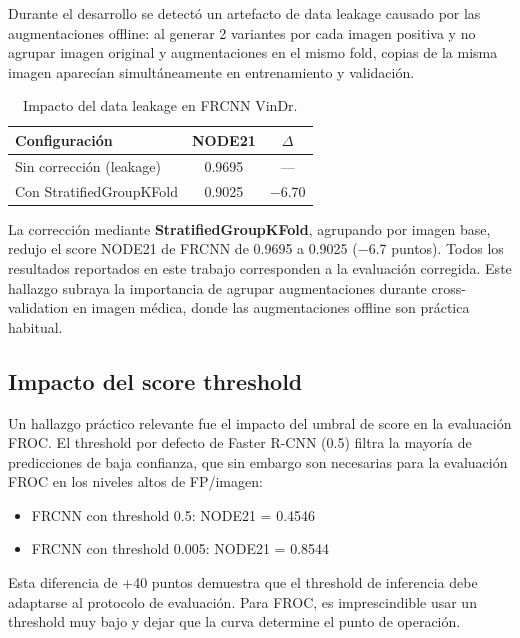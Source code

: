 \documentclass[conference]{IEEEtran}
\begin{document}
Durante el desarrollo se detectó un artefacto de data leakage causado por las augmentaciones offline: al generar 2 variantes por cada imagen positiva y no agrupar imagen original y augmentaciones en el mismo fold, copias de la misma imagen aparecían simultáneamente en entrenamiento y validación.

\begin{table}[!t]
\centering
\caption{Impacto del data leakage en FRCNN VinDr.}
\label{tab:leakage}
\renewcommand{\arraystretch}{1.1}
\begin{tabular}{lcc}
\toprule
\textbf{Configuración} & \textbf{NODE21} & \textbf{$\Delta$} \\
\midrule
Sin corrección (leakage) & 0.9695 & --- \\
Con StratifiedGroupKFold & 0.9025 & $-$6.70 \\
\bottomrule
\end{tabular}
\end{table}

La corrección mediante \textbf{StratifiedGroupKFold}, agrupando por imagen base, redujo el score NODE21 de FRCNN de 0.9695 a 0.9025 ($-$6.7 puntos). Todos los resultados reportados en este trabajo corresponden a la evaluación corregida. Este hallazgo subraya la importancia de agrupar augmentaciones durante cross-validation en imagen médica, donde las augmentaciones offline son práctica habitual.

\subsection{Impacto del score threshold}

Un hallazgo práctico relevante fue el impacto del umbral de score en la evaluación FROC. El threshold por defecto de Faster R-CNN (0.5) filtra la mayoría de predicciones de baja confianza, que sin embargo son necesarias para la evaluación FROC en los niveles altos de FP/imagen:

\begin{itemize}
    \item FRCNN con threshold 0.5: NODE21 = 0.4546
    \item FRCNN con threshold 0.005: NODE21 = 0.8544
\end{itemize}

Esta diferencia de +40 puntos demuestra que el threshold de inferencia debe adaptarse al protocolo de evaluación. Para FROC, es imprescindible usar un threshold muy bajo y dejar que la curva determine el punto de operación.
\end{document}
